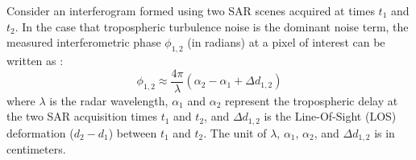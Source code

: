 \documentclass{utexasthesis}
\begin{document}

Consider an interferogram formed using two SAR scenes acquired at times $t_1$ and $t_2$. In the case that tropospheric turbulence noise is the dominant noise term, the measured interferometric phase $\phi_{1,2}$ (in radians) at a pixel of interest can be written as \citep{Zebker1997AtmosphericEffectsInterferometric}:
\begin{equation}
\phi_{1,2} \approx \frac{4 \pi}{\lambda} \left(\alpha_2 - \alpha_1 + \Delta d_{1,2} \right)
\end{equation}
where $ \lambda $ is the radar wavelength, $\alpha_1$ and $\alpha_2$ represent the tropospheric delay at the two SAR acquisition times $t_1$ and $t_2$, and $\Delta d_{1,2} $ is the Line-Of-Sight (LOS) deformation ($d_2-d_1$) between $t_1$ and $t_2$. The unit of $\lambda$, $\alpha_1$, $\alpha_2$, and $\Delta d_{1,2} $ is in centimeters. 
\end{document}
